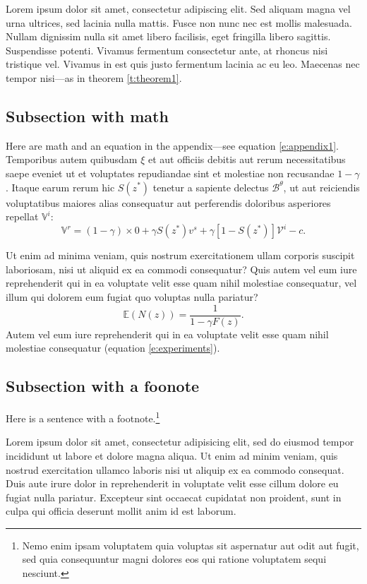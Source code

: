\documentclass[letterpaper,11pt,leqno]{article}
\begin{document}
Lorem ipsum dolor sit amet, consectetur adipiscing elit. Sed aliquam magna vel urna ultrices, sed lacinia nulla mattis. Fusce non nunc nec est mollis malesuada. Nullam dignissim nulla sit amet libero facilisis, eget fringilla libero sagittis. Suspendisse potenti. Vivamus fermentum consectetur ante, at rhoncus nisi tristique vel. Vivamus in est quis justo fermentum lacinia ac eu leo. Maecenas nec tempor nisi---as in theorem \ref{t:theorem1}.

\subsection{Subsection with math}

Here are math and an equation in the appendix---see equation \eqref{e:appendix1}. Temporibus autem quibusdam $\xi$ et aut officiis debitis aut rerum necessitatibus saepe eveniet ut et voluptates repudiandae sint et molestiae non recusandae $1-\gamma$. Itaque earum rerum hic $S(z^*)$ tenetur a sapiente delectus $\mathcal{B}^\theta$, ut aut reiciendis voluptatibus maiores alias consequatur aut perferendis doloribus asperiores repellat $\mathbb{V}^i$:
\begin{equation}
\mathbb{V}^r = (1-\gamma) \times 0 +\gamma S(z^*) v^s+\gamma [1-S(z^*)] \mathcal{V}^i-c.
\label{e:appendix1}\end{equation}

Ut enim ad minima veniam, quis nostrum exercitationem ullam corporis suscipit laboriosam, nisi ut aliquid ex ea commodi consequatur? Quis autem vel eum iure reprehenderit qui in ea voluptate velit esse quam nihil molestiae consequatur, vel illum qui dolorem eum fugiat quo voluptas nulla pariatur? 
\begin{equation}
\mathbb{E}(N(z)) = \frac{1}{1-\gamma F(z)}.
\label{e:experiments}\end{equation}
Autem vel eum iure reprehenderit qui in ea voluptate velit esse quam nihil molestiae consequatur (equation \eqref{e:experiments}).

\subsection{Subsection with a foonote}

Here is a sentence with a footnote.\footnote{Nemo enim ipsam voluptatem quia voluptas sit aspernatur aut odit aut fugit, sed quia consequuntur magni dolores eos qui ratione voluptatem sequi nesciunt.} 

Lorem ipsum dolor sit amet, consectetur adipisicing elit, sed do eiusmod tempor incididunt ut labore et dolore magna aliqua. Ut enim ad minim veniam,
quis nostrud exercitation ullamco laboris nisi ut aliquip ex ea commodo
consequat. Duis aute irure dolor in reprehenderit in voluptate velit esse
cillum dolore eu fugiat nulla pariatur. Excepteur sint occaecat cupidatat non
proident, sunt in culpa qui officia deserunt mollit anim id est laborum.
\end{document}
